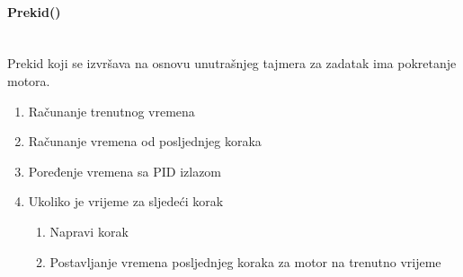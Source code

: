 \documentclass[../Document.tex]{subfiles}
\begin{document}
\paragraph{Prekid()}\mbox{}\\
\noindent Prekid koji se izvršava na osnovu unutrašnjeg tajmera za zadatak ima pokretanje motora.

\begin{enumerate}
    \item Računanje trenutnog vremena
    \item Računanje vremena od posljednjeg koraka
    \item Poređenje vremena sa PID izlazom
    \item Ukoliko je vrijeme za sljedeći korak
          \begin{enumerate}
              \item Napravi korak
              \item Postavljanje vremena posljednjeg koraka za motor na trenutno vrijeme
          \end{enumerate}
\end{enumerate}
\end{document}
